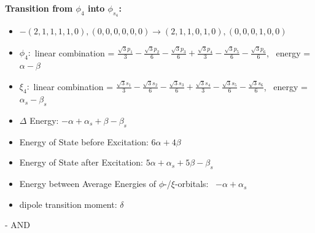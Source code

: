 \documentclass[12pt,a4paper]{article}
\begin{document}
        \noindent\textbf{Transition from $\phi_{4}$ into $\phi_{s_{4}}$:}
        \begin{itemize}
            \item $- (2, 1, 1, 1, 1, 0), (0, 0, 0, 0, 0, 0) \rightarrow (2, 1, 1, 0, 1, 0), (0, 0, 0, 1, 0, 0)$
        
            \item $\phi_{4}:$ linear combination = $\frac{\sqrt{3} p_{1}}{3} - \frac{\sqrt{3} p_{2}}{6} - \frac{\sqrt{3} p_{3}}{6} + \frac{\sqrt{3} p_{4}}{3} - \frac{\sqrt{3} p_{5}}{6} - \frac{\sqrt{3} p_{6}}{6}$, \
            energy = $\alpha - \beta$
            
            \item $\xi_{4}:$ linear combination = $\frac{\sqrt{3} s_{1}}{3} - \frac{\sqrt{3} s_{2}}{6} - \frac{\sqrt{3} s_{3}}{6} + \frac{\sqrt{3} s_{4}}{3} - \frac{\sqrt{3} s_{5}}{6} - \frac{\sqrt{3} s_{6}}{6}$, \
            energy = $\alpha_{s} - \beta_{s}$
            
            \item $\Delta$ Energy: $- \alpha + \alpha_{s} + \beta - \beta_{s}$
            \item Energy of State before Excitation: $6 \alpha + 4 \beta$
            \item Energy of State after Excitation: $5 \alpha + \alpha_{s} + 5 \beta - \beta_{s}$
            \item Energy between Average Energies of $\phi$-/$\xi$-orbitals: \
            $- \alpha + \alpha_{s}$
        
            \item dipole transition moment: $\delta$
        
        \end{itemize}
        
 -  AND 
\end{document}
